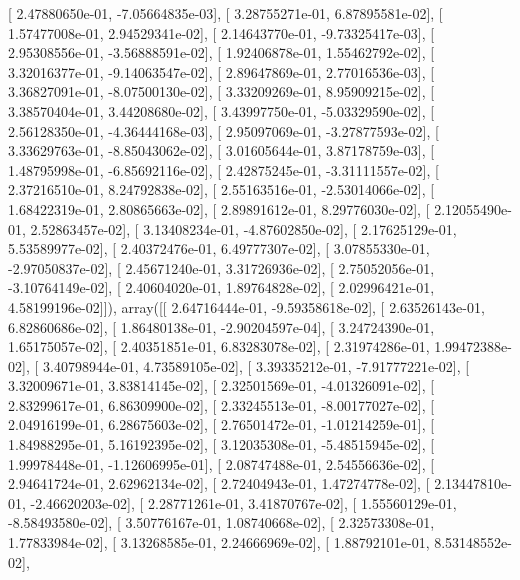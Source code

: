 \documentclass{article}
\begin{document}
       [  2.47880650e-01,  -7.05664835e-03],
       [  3.28755271e-01,   6.87895581e-02],
       [  1.57477008e-01,   2.94529341e-02],
       [  2.14643770e-01,  -9.73325417e-03],
       [  2.95308556e-01,  -3.56888591e-02],
       [  1.92406878e-01,   1.55462792e-02],
       [  3.32016377e-01,  -9.14063547e-02],
       [  2.89647869e-01,   2.77016536e-03],
       [  3.36827091e-01,  -8.07500130e-02],
       [  3.33209269e-01,   8.95909215e-02],
       [  3.38570404e-01,   3.44208680e-02],
       [  3.43997750e-01,  -5.03329590e-02],
       [  2.56128350e-01,  -4.36444168e-03],
       [  2.95097069e-01,  -3.27877593e-02],
       [  3.33629763e-01,  -8.85043062e-02],
       [  3.01605644e-01,   3.87178759e-03],
       [  1.48795998e-01,  -6.85692116e-02],
       [  2.42875245e-01,  -3.31111557e-02],
       [  2.37216510e-01,   8.24792838e-02],
       [  2.55163516e-01,  -2.53014066e-02],
       [  1.68422319e-01,   2.80865663e-02],
       [  2.89891612e-01,   8.29776030e-02],
       [  2.12055490e-01,   2.52863457e-02],
       [  3.13408234e-01,  -4.87602850e-02],
       [  2.17625129e-01,   5.53589977e-02],
       [  2.40372476e-01,   6.49777307e-02],
       [  3.07855330e-01,  -2.97050837e-02],
       [  2.45671240e-01,   3.31726936e-02],
       [  2.75052056e-01,  -3.10764149e-02],
       [  2.40604020e-01,   1.89764828e-02],
       [  2.02996421e-01,   4.58199196e-02]]), array([[  2.64716444e-01,  -9.59358618e-02],
       [  2.63526143e-01,   6.82860686e-02],
       [  1.86480138e-01,  -2.90204597e-04],
       [  3.24724390e-01,   1.65175057e-02],
       [  2.40351851e-01,   6.83283078e-02],
       [  2.31974286e-01,   1.99472388e-02],
       [  3.40798944e-01,   4.73589105e-02],
       [  3.39335212e-01,  -7.91777221e-02],
       [  3.32009671e-01,   3.83814145e-02],
       [  2.32501569e-01,  -4.01326091e-02],
       [  2.83299617e-01,   6.86309900e-02],
       [  2.33245513e-01,  -8.00177027e-02],
       [  2.04916199e-01,   6.28675603e-02],
       [  2.76501472e-01,  -1.01214259e-01],
       [  1.84988295e-01,   5.16192395e-02],
       [  3.12035308e-01,  -5.48515945e-02],
       [  1.99978448e-01,  -1.12606995e-01],
       [  2.08747488e-01,   2.54556636e-02],
       [  2.94641724e-01,   2.62962134e-02],
       [  2.72404943e-01,   1.47274778e-02],
       [  2.13447810e-01,  -2.46620203e-02],
       [  2.28771261e-01,   3.41870767e-02],
       [  1.55560129e-01,  -8.58493580e-02],
       [  3.50776167e-01,   1.08740668e-02],
       [  2.32573308e-01,   1.77833984e-02],
       [  3.13268585e-01,   2.24666969e-02],
       [  1.88792101e-01,   8.53148552e-02],
\end{document}
